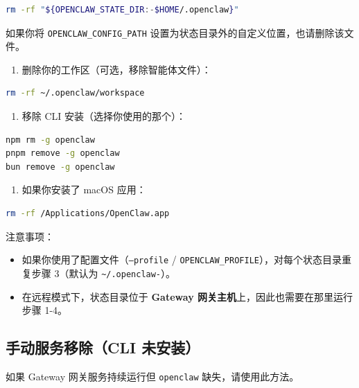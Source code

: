 \begin{lstlisting}[language=bash]
rm -rf "${OPENCLAW_STATE_DIR:-$HOME/.openclaw}"
\end{lstlisting}


如果你将 \texttt{OPENCLAW\_CONFIG\_PATH} 设置为状态目录外的自定义位置，也请删除该文件。

\begin{enumerate}
  \item 删除你的工作区（可选，移除智能体文件）：
\end{enumerate}


\begin{lstlisting}[language=bash]
rm -rf ~/.openclaw/workspace
\end{lstlisting}


\begin{enumerate}
  \item 移除 CLI 安装（选择你使用的那个）：
\end{enumerate}


\begin{lstlisting}[language=bash]
npm rm -g openclaw
pnpm remove -g openclaw
bun remove -g openclaw
\end{lstlisting}


\begin{enumerate}
  \item 如果你安装了 macOS 应用：
\end{enumerate}


\begin{lstlisting}[language=bash]
rm -rf /Applications/OpenClaw.app
\end{lstlisting}


注意事项：

\begin{itemize}
  \item 如果你使用了配置文件（\texttt{--profile} / \texttt{OPENCLAW\_PROFILE}），对每个状态目录重复步骤 3（默认为 \texttt{\textasciitilde{}/.openclaw-}）。
  \item 在远程模式下，状态目录位于 \textbf{Gateway 网关主机}上，因此也需要在那里运行步骤 1-4。
\end{itemize}


\subsection{手动服务移除（CLI 未安装）}


如果 Gateway 网关服务持续运行但 \texttt{openclaw} 缺失，请使用此方法。

